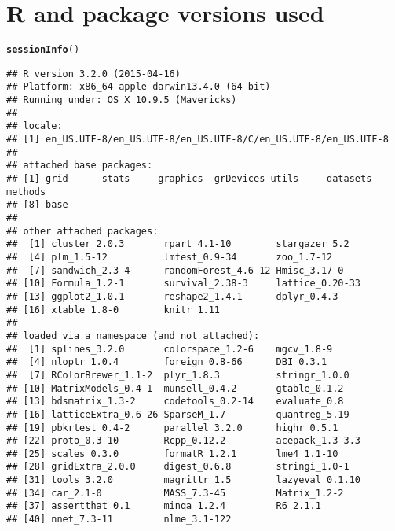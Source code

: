 \documentclass[11pt]{article}\usepackage[]{graphicx}\usepackage[]{color}
\makeatletter
\newcommand{\hlstd}[1]{\textcolor[rgb]{0.345,0.345,0.345}{#1}}%
\newcommand{\hlkwd}[1]{\textcolor[rgb]{0.737,0.353,0.396}{\textbf{#1}}}%
\newenvironment{kframe}{%
 \def\at@end@of@kframe{}%
 \ifinner\ifhmode%
  \def\at@end@of@kframe{\end{minipage}}%
  \begin{minipage}{\columnwidth}%
 \fi\fi%
 \def\FrameCommand##1{\hskip\@totalleftmargin \hskip-\fboxsep
 \colorbox{shadecolor}{##1}\hskip-\fboxsep
     \hskip-\linewidth \hskip-\@totalleftmargin \hskip\columnwidth}%
 \MakeFramed {\advance\hsize-\width
   \@totalleftmargin\z@ \linewidth\hsize
   \@setminipage}}%
 {\par\unskip\endMakeFramed%
 \at@end@of@kframe}
\newenvironment{knitrout}{}{} %
\makeatother
\begin{document}
\clearpage


\section{R and package versions used}
\begin{knitrout}
\color{fgcolor}\begin{kframe}
\begin{alltt}
\hlkwd{sessionInfo}\hlstd{()}
\end{alltt}
\begin{verbatim}
## R version 3.2.0 (2015-04-16)
## Platform: x86_64-apple-darwin13.4.0 (64-bit)
## Running under: OS X 10.9.5 (Mavericks)
## 
## locale:
## [1] en_US.UTF-8/en_US.UTF-8/en_US.UTF-8/C/en_US.UTF-8/en_US.UTF-8
## 
## attached base packages:
## [1] grid      stats     graphics  grDevices utils     datasets  methods  
## [8] base     
## 
## other attached packages:
##  [1] cluster_2.0.3       rpart_4.1-10        stargazer_5.2      
##  [4] plm_1.5-12          lmtest_0.9-34       zoo_1.7-12         
##  [7] sandwich_2.3-4      randomForest_4.6-12 Hmisc_3.17-0       
## [10] Formula_1.2-1       survival_2.38-3     lattice_0.20-33    
## [13] ggplot2_1.0.1       reshape2_1.4.1      dplyr_0.4.3        
## [16] xtable_1.8-0        knitr_1.11         
## 
## loaded via a namespace (and not attached):
##  [1] splines_3.2.0       colorspace_1.2-6    mgcv_1.8-9         
##  [4] nloptr_1.0.4        foreign_0.8-66      DBI_0.3.1          
##  [7] RColorBrewer_1.1-2  plyr_1.8.3          stringr_1.0.0      
## [10] MatrixModels_0.4-1  munsell_0.4.2       gtable_0.1.2       
## [13] bdsmatrix_1.3-2     codetools_0.2-14    evaluate_0.8       
## [16] latticeExtra_0.6-26 SparseM_1.7         quantreg_5.19      
## [19] pbkrtest_0.4-2      parallel_3.2.0      highr_0.5.1        
## [22] proto_0.3-10        Rcpp_0.12.2         acepack_1.3-3.3    
## [25] scales_0.3.0        formatR_1.2.1       lme4_1.1-10        
## [28] gridExtra_2.0.0     digest_0.6.8        stringi_1.0-1      
## [31] tools_3.2.0         magrittr_1.5        lazyeval_0.1.10    
## [34] car_2.1-0           MASS_7.3-45         Matrix_1.2-2       
## [37] assertthat_0.1      minqa_1.2.4         R6_2.1.1           
## [40] nnet_7.3-11         nlme_3.1-122
\end{verbatim}
\end{kframe}
\end{knitrout}
\end{document}
